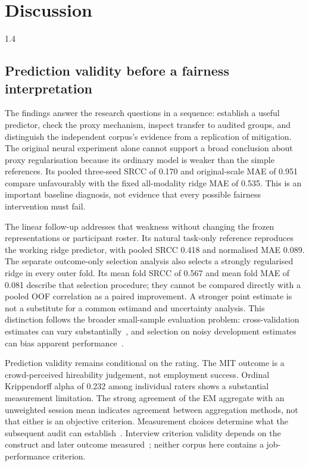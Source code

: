\chapter{Discussion}
\label{ch:discussion}
\begin{spacing}{1.4}

\section{Prediction validity before a fairness interpretation}

The findings answer the research questions in a sequence: establish a useful predictor,
check the proxy mechanism, inspect transfer to audited groups, and distinguish the
independent corpus's evidence from a replication of mitigation. The original neural
experiment alone cannot support a broad conclusion about proxy regularisation because
its ordinary model is weaker than the simple references. Its pooled three-seed SRCC of
0.170 and original-scale MAE of 0.951 compare unfavourably with the fixed all-modality
ridge MAE of 0.535. This is an important baseline diagnosis, not evidence that every
possible fairness intervention must fail.

The linear follow-up addresses that weakness without changing the frozen representations
or participant roster. Its natural task-only reference reproduces the working ridge
predictor, with pooled SRCC 0.418 and normalised MAE 0.089. The separate outcome-only
selection analysis also selects a strongly regularised ridge in every outer fold.
Its mean fold SRCC of 0.567 and mean fold MAE of 0.081 describe that selection procedure;
they cannot be compared directly with a pooled OOF correlation as a paired improvement.
A stronger point estimate is not a substitute for a common estimand and uncertainty
analysis. This distinction follows the broader small-sample evaluation problem:
cross-validation estimates can vary substantially~\cite{Varoquaux2018}, and selection
on noisy development estimates can bias apparent performance~\cite{CawleyTalbot2010}.

Prediction validity remains conditional on the rating. The MIT outcome is a crowd-perceived
hireability judgement, not employment success. Ordinal Krippendorff alpha of 0.232 among
individual raters shows a substantial measurement limitation. The strong agreement of the
EM aggregate with an unweighted session mean indicates agreement between aggregation
methods, not that either is an objective criterion. Measurement choices determine what
the subsequent audit can establish~\cite{JacobsWallach2021}. Interview criterion validity
depends on the construct and later outcome measured~\cite{Wingate2025ConstructValidity};
neither corpus here contains a job-performance criterion.


\end{spacing}
